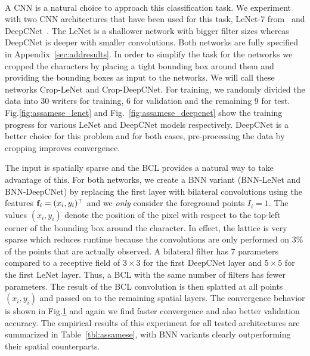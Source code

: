 \begin{figure}[t]
  \centering
  \\
\label{fig:assamese_experiment}
  \vspace{-0.3cm}
\end{figure}


A CNN is a natural choice to approach this classification task. We experiment with two CNN
architectures that have been used for this task, LeNet-7 from~\cite{lecun1998gradient}
and DeepCNet~\cite{ciresan2012multi, graham2014spatially}. The LeNet is a shallower network with
bigger filter sizes whereas DeepCNet is deeper with smaller convolutions.
Both networks are fully specified in
Appendix~\ref{sec:addresults}. In order to simplify the task for the networks we cropped the
characters by placing a tight bounding box around them and providing the bounding boxes as input to the
networks. We will call these networks
Crop-LeNet and Crop-DeepCNet. For training, we randomly divided the data into 30 writers for training,
6 for validation and the remaining 9 for
test. Fig.\ref{fig:assamese_lenet} and Fig.~\ref{fig:assamese_deepcnet} show the training progress for various
LeNet and DeepCNet models respectively. DeepCNet is a better choice for this problem and for both cases,
pre-processing the data by cropping improves convergence.

The input is spatially sparse and the BCL provides a natural way to take advantage of this. For
both networks, we create a BNN variant (BNN-LeNet and BNN-DeepCNet) by replacing the
first layer with bilateral convolutions using the features $\mathbf{f}_i = (x_i, y_i)^{\top}$ and we \emph{only}
consider the foreground points $I_i=1$. The values $(x_i,y_i)$ denote the position of the pixel with respect
to the top-left corner of the bounding box around the character. In effect, the lattice is very
sparse which reduces runtime because the convolutions are only performed on $3\%$ of the
points that are actually observed. A bilateral filter has $7$ parameters compared to a receptive field of $3\times 3$ for the first
DeepCNet layer and $5\times 5$ for the first LeNet layer. Thus, a BCL with the same number of filters has fewer parameters.
The result of the BCL convolution is then splatted at all points $(x_i,y_i)$ and
passed on to the remaining spatial layers. The convergence behavior is shown in Fig.\ref{fig:assamese_experiment}
and again we find faster convergence and also better validation accuracy. The empirical results of this
experiment for all tested architectures are summarized in Table~\ref{tbl:assamese}, with BNN variants
clearly outperforming their spatial counterparts.

